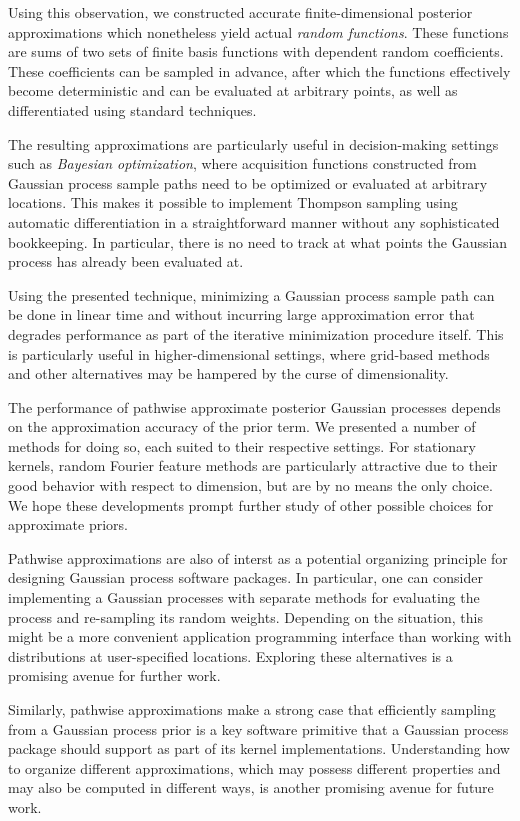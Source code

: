\documentclass[11pt]{book}
\begin{document}
Using this observation, we constructed accurate finite-dimensional posterior approximations which nonetheless yield actual \emph{random functions}.
These functions are sums of two sets of finite basis functions with dependent random coefficients.
These coefficients can be sampled in advance, after which the functions effectively become deterministic and can be evaluated at arbitrary points, as well as differentiated using standard techniques.

The resulting approximations are particularly useful in decision-making settings such as \emph{Bayesian optimization}, where acquisition functions constructed from Gaussian process sample paths need to be optimized or evaluated at arbitrary locations.
This makes it possible to implement Thompson sampling using automatic differentiation in a straightforward manner without any sophisticated bookkeeping.
In particular, there is no need to track at what points the Gaussian process has already been evaluated at.

Using the presented technique, minimizing a Gaussian process sample path can be done in linear time and without incurring large approximation error that degrades performance as part of the iterative minimization procedure itself.
This is particularly useful in higher-dimensional settings, where grid-based methods and other alternatives may be hampered by the curse of dimensionality.

The performance of pathwise approximate posterior Gaussian processes depends on the approximation accuracy of the prior term.
We presented a number of methods for doing so, each suited to their respective settings.
For stationary kernels, random Fourier feature methods are particularly attractive due to their good behavior with respect to dimension, but are by no means the only choice.
We hope these developments prompt further study of other possible choices for approximate priors.

Pathwise approximations are also of interst as a potential organizing principle for designing Gaussian process software packages.
In particular, one can consider implementing a Gaussian processes with separate methods for evaluating the process and re-sampling its random weights.
Depending on the situation, this might be a more convenient application programming interface than working with distributions at user-specified locations.
Exploring these alternatives is a promising avenue for further work.

Similarly, pathwise approximations make a strong case that efficiently sampling from a Gaussian process prior is a key software primitive that a Gaussian process package should support as part of its kernel implementations. 
Understanding how to organize different approximations, which may possess different properties and may also be computed in different ways, is another promising avenue for future work.
\end{document}
